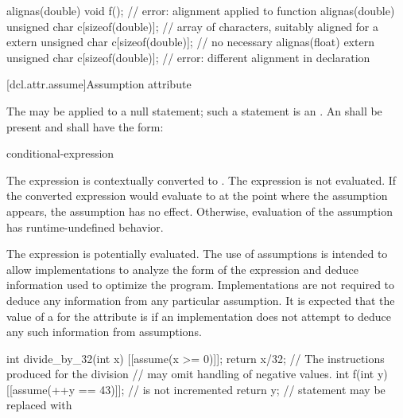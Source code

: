 \pnum
\begin{example}
\begin{codeblock}
alignas(double) void f();                           // error: alignment applied to function
alignas(double) unsigned char c[sizeof(double)];    // array of characters, suitably aligned for a 
extern unsigned char c[sizeof(double)];             // no  necessary
alignas(float)
  extern unsigned char c[sizeof(double)];           // error: different alignment in declaration
\end{codeblock}
\end{example}

[dcl.attr.assume]{Assumption attribute}

\pnum
The   may be applied to a null statement;
such a statement is an .
An  shall be present and
shall have the form:
\begin{ncsimplebnf}
\terminal{(} conditional-expression \terminal{)}
\end{ncsimplebnf}
The expression is contextually converted to .
The expression is not evaluated.
If the converted expression would evaluate to 
at the point where the assumption appears,
the assumption has no effect.
Otherwise,
evaluation of the assumption has runtime-undefined behavior.

\pnum
\begin{note}
The expression is potentially evaluated.
The use of assumptions is intended to allow implementations
to analyze the form of the expression and
deduce information used to optimize the program.
Implementations are not required to deduce
any information from any particular assumption.
It is expected that the value of
a  for the  attribute
is 
if an implementation does not attempt to deduce
any such information from assumptions.
\end{note}

\pnum
\begin{example}
\begin{codeblock}
int divide_by_32(int x) {
  [[assume(x >= 0)]];
  return x/32;                  // The instructions produced for the division
                                // may omit handling of negative values.
}
int f(int y) {
  [[assume(++y == 43)]];        //  is not incremented
  return y;                     // statement may be replaced with 
}
\end{codeblock}
\end{example}

